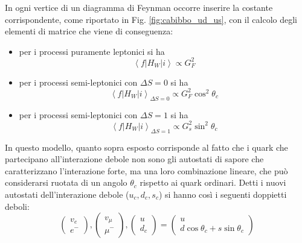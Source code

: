 \documentclass{subnucbo}
\begin{document}
In ogni vertice di un diagramma di Feynman occorre inserire la costante corrispondente, come riportato in Fig. \ref{fig:cabibbo_ud_us}, con il calcolo degli elementi di matrice che viene di conseguenza:
\begin{itemize}
        \item per i processi puramente leptonici si ha
                \begin{equation}
                        \left\langle f \left| H _ { W } \right| i \right\rangle \propto G^{2} _ { F }
                        \label{eq:genu}
                \end{equation}
        \item per i processi semi-leptonici con $\Delta S = 0$ si ha
                \begin{equation}
                        \left\langle f \left| H _ { W } \right| i \right\rangle _ { \Delta S = 0 } \propto G^{2} _ { F }\cos^{2}\theta_{c}
                \label{eq:gd}
        \end{equation}
        \item per i processi semi-leptonici con $\Delta S = 1$ si ha
        \begin{equation}
                \left\langle f \left| H _ { W } \right| i \right\rangle _ { \Delta S = 1 } \propto  G^{2} _ { s }\sin^{2}\theta_{c}
                \label{eq:gs}
        \end{equation}
\end{itemize}
In questo modello, quanto sopra esposto corrisponde al fatto che i quark che partecipano all'interazione debole non sono gli autostati di sapore che caratterizzano l'interazione forte, ma una loro combinazione lineare, che può considerarsi ruotata di un angolo $\theta_{c}$ rispetto ai quark ordinari. Detti i nuovi autostati dell'interazione debole ($u_{c}, d_{c}, s_{c}$) si hanno così i seguenti doppietti deboli:
\begin{equation}
        \left( \begin{array} { c } { v _ { e } } \\ { e ^ { - } } \end{array} \right) , \left( \begin{array} { c } { v _ { \mu } } \\ { \mu ^ { - } } \end{array} \right) , \left( \begin{array} { c } { u } \\ { d _ { c } } \end{array} \right) = \left( \begin{array} { c } { u } \\ { d \cos \theta _ { c } + s \sin \theta _ { c } } \end{array} \right)
        \label{eq:weak_doublets}
\end{equation}
\end{document}
